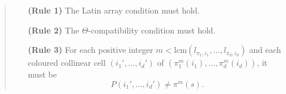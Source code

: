 \documentclass{article}
\begin{document}
\begin{quote}
\begin{enumerate}
\item[\bf(Rule 1)] The Latin array condition must hold.
\item[\bf(Rule 2)] The $\Theta$-compatibility condition must hold.
\item[\bf(Rule 3)] For each positive integer $m<\mathrm{lcm}(l_{\pi_1,i_1},\ldots,l_{\pi_d,i_d})$ and each coloured collinear cell $(i_1',\ldots,i_d')$ of $(\pi_1^m(i_1),\ldots,\pi_d^m(i_d))$, it must be
\begin{equation}\label{extendedneighbourGauto}
P(i_1',\ldots,i_d')\neq \pi^m(s).
\end{equation}
\end{enumerate}
\end{quote}
\end{document}
